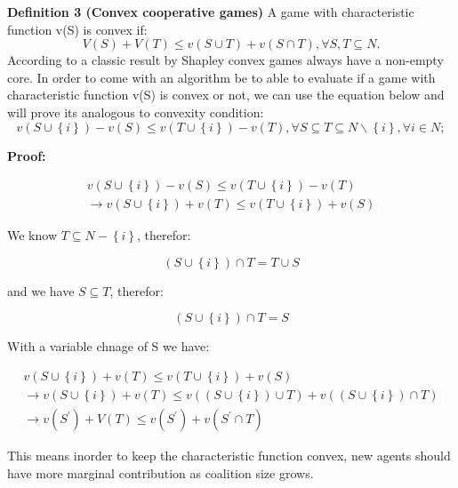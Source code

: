 \documentclass[10pt, conference, compsocconf]{IEEEtran}
\theoremstyle{plain}
\theoremstyle{definition}
\begin{document}
{\bf Definition 3 (Convex cooperative games)} A game with characteristic function v(S) is convex if:
\begin{equation}\label{eq:convex}
V(S) + V(T) \leq v(S \cup T) + v (S \cap T), \forall S,T \subseteq N.
\end{equation}
According to a classic result by Shapley \cite{S1971cores} convex games always have a non-empty core. In order to come with an algorithm be to able to evaluate if a game with characteristic function v(S) is convex or not, we can use the equation below and will prove its analogous to convexity condition:
\begin{equation}\label{eq:convex_snow}
v(S \cup \left\{i\right\}) - v(S) \leq v (T \cup \left\{i\right\}) - v(T), \forall S \subseteq T \subseteq N \backslash \left\{i\right\}, \forall i \in N; 
\end{equation}

{\bf Proof:} 

\begin{gather*}\label{convexsnowproof}
v(S \cup \left\{i\right\}) - v(S) \leq v (T \cup \left\{i\right\}) - v(T)
\\
\rightarrow v(S \cup \left\{i\right\}) + v(T) \leq v (T \cup \left\{i\right\}) + v(S)
\end{gather*}

We know $T \subseteq N - \left\{i\right\}$, therefor:

\begin{equation*}
(S \cup \left\{i\right\}) \cap T = T \cup S
\end{equation*}

and we have $S \subseteq T$, therefor:

\begin{equation*}
(S \cup \left\{i\right\}) \cap T = S
\end{equation*}

With a variable chnage of S we have:

\begin{gather*}
v(S \cup \left\{i\right\}) + v(T) \leq v (T \cup \left\{i\right\}) + v(S)
\\
\rightarrow v(S \cup \left\{i\right\}) + v(T) \leq v((S \cup \left\{i\right\}) \cup T) + v((S \cup \left\{i\right\}) \cap T)
\\
\rightarrow v(S^\prime) + V(T) \leq v(S^\prime) + v(S^\prime \cap T)
\end{gather*}

This means inorder to keep the characteristic function convex, new agents should have more marginal contribution as coalition size grows.
\end{document}
